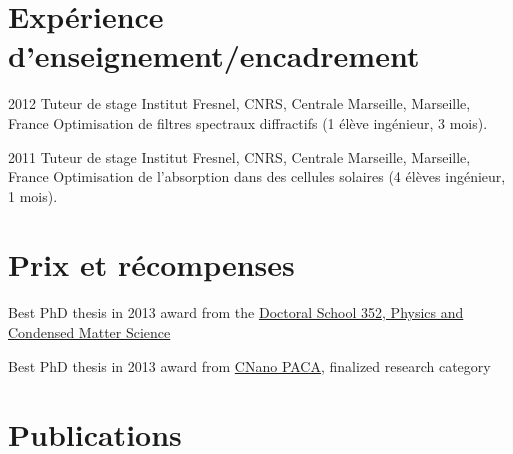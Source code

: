 \documentclass[]{cv} %
\begin{document}
\vspace*{-0.2cm}
\section{Expérience d'enseignement/encadrement}

\begin{entrylist}
\entry
{2012}
{Tuteur de stage}
{{Institut Fresnel}, CNRS, Centrale Marseille, Marseille, France}
{Optimisation de filtres spectraux diffractifs (1 élève ingénieur, 3 mois).}

\entry
{2011}
{Tuteur de stage}
{{Institut Fresnel}, CNRS, Centrale Marseille, Marseille, France}
{Optimisation de l'absorption dans des cellules solaires (4 élèves ingénieur, 1 mois).}


\end{entrylist}

\vspace*{-0.2cm}
\section{Prix et récompenses}

{Best PhD thesis in 2013 award} from the {\href{http://ed352.sciences.univmed.fr/}{Doctoral School 352, Physics and Condensed Matter Science}}

{Best PhD thesis in 2013 award from {\href{www.cnano-paca.fr/}{CNano PACA}}, finalized research category}

%

 \section{Publications}
%

\end{document}
